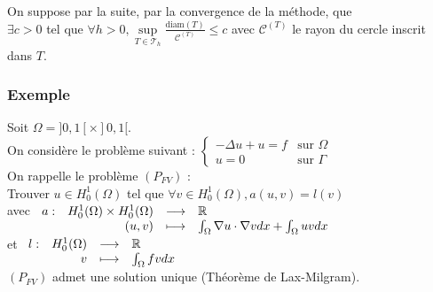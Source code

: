 \documentclass[12pt,a4paper]{article}
\begin{document}
On suppose par la suite, par la convergence de la méthode, que \\
$\exists c > 0$ tel que $\forall h > 0, \underset{T \in \mathcal{T}_h}{\sup} \frac{\text{diam}(T)}{\mathcal{C}^{(T)}} \leq c$ avec $\mathcal{C}^{(T)}$ le rayon du cercle inscrit dans $T$. \\



\subsubsection{Exemple}

Soit $\Omega = ]0, 1[ \times ]0, 1[$. \\
On considère le problème suivant :
$\begin{cases}
    -\Delta u + u = f & \text{sur } \Omega \\
    u = 0 & \text{sur } \Gamma
\end{cases}$\\

On rappelle le problème $(P_{FV})$ : \\
Trouver $u \in H^1_0(\Omega)$ tel que $\forall v \in H^1_0(\Omega), a(u, v) = l(v)$ \\
avec $\begin{array}[t]{lrcl}
    a : & H^1_0(\Omega) \times H^1_0(\Omega) & \longrightarrow & \mathbb{R} \\
    & (u, v) & \longmapsto & \int_{\Omega} \nabla u \cdot \nabla v dx + \int_{\Omega} uv dx
\end{array}$ \\
et $\begin{array}[t]{lrcl}
    l : & H^1_0(\Omega) & \longrightarrow & \mathbb{R} \\
    & v & \longmapsto & \int_{\Omega} fv dx
\end{array}$\\
$(P_{FV})$ admet une solution unique (Théorème de Lax-Milgram). \\
\end{document}
